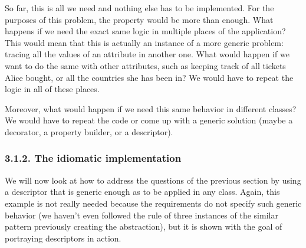 \documentclass[a4paper,10pt,english]{sphinxmanual}
\begin{document}
\begin{sphinxVerbatim}[commandchars=\\\{\}]
   
  
  
  
\end{sphinxVerbatim}

So far, this is all we need and nothing else has to be implemented. For the purposes of this
problem, the property would be more than enough. What happens if we need the exact
same logic in multiple places of the application? This would mean that this is actually an
instance of a more generic problem: tracing all the values of an attribute in another one.
What would happen if we want to do the same with other attributes, such as keeping track
of all tickets Alice bought, or all the countries she has been in? We would have to repeat the
logic in all of these places.

Moreover, what would happen if we need this same behavior in different classes? We
would have to repeat the code or come up with a generic solution (maybe a decorator, a
property builder, or a descriptor).


\subsubsection{3.1.2. The idiomatic implementation}
\label{\detokenize{chapters/6_descriptors/index:the-idiomatic-implementation}}
We will now look at how to address the questions of the previous section by using a
descriptor that is generic enough as to be applied in any class. Again, this example is not
really needed because the requirements do not specify such generic behavior (we haven’t
even followed the rule of three instances of the similar pattern previously creating the
abstraction), but it is shown with the goal of portraying descriptors in action.
\end{document}
